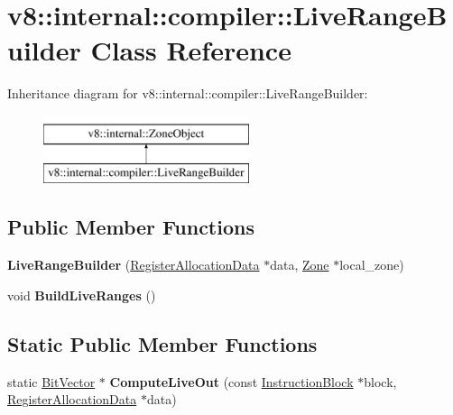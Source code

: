 \hypertarget{classv8_1_1internal_1_1compiler_1_1LiveRangeBuilder}{}\section{v8\+:\+:internal\+:\+:compiler\+:\+:Live\+Range\+Builder Class Reference}
\label{classv8_1_1internal_1_1compiler_1_1LiveRangeBuilder}
Inheritance diagram for v8\+:\+:internal\+:\+:compiler\+:\+:Live\+Range\+Builder\+:\begin{figure}[H]
\begin{center}
\leavevmode
\includegraphics[height=2.000000cm]{classv8_1_1internal_1_1compiler_1_1LiveRangeBuilder}
\end{center}
\end{figure}
\subsection*{Public Member Functions}
\begin{DoxyCompactItemize}
\item 
\mbox{\label{classv8_1_1internal_1_1compiler_1_1LiveRangeBuilder_afba1597ff4fa8b4e34b98973281f30d9}} 
{\bfseries Live\+Range\+Builder} (\mbox{\hyperlink{classv8_1_1internal_1_1compiler_1_1RegisterAllocationData}{Register\+Allocation\+Data}} $\ast$data, \mbox{\hyperlink{classv8_1_1internal_1_1Zone}{Zone}} $\ast$local\+\_\+zone)
\item 
\mbox{\label{classv8_1_1internal_1_1compiler_1_1LiveRangeBuilder_a05f8a8d1f9c83f343b315774a152eb29}} 
void {\bfseries Build\+Live\+Ranges} ()
\end{DoxyCompactItemize}
\subsection*{Static Public Member Functions}
\begin{DoxyCompactItemize}
\item 
\mbox{\label{classv8_1_1internal_1_1compiler_1_1LiveRangeBuilder_a760b7baedce539c7d2d014feceee8ee6}} 
static \mbox{\hyperlink{classv8_1_1internal_1_1BitVector}{Bit\+Vector}} $\ast$ {\bfseries Compute\+Live\+Out} (const \mbox{\hyperlink{classv8_1_1internal_1_1compiler_1_1InstructionBlock}{Instruction\+Block}} $\ast$block, \mbox{\hyperlink{classv8_1_1internal_1_1compiler_1_1RegisterAllocationData}{Register\+Allocation\+Data}} $\ast$data)
\end{DoxyCompactItemize}


